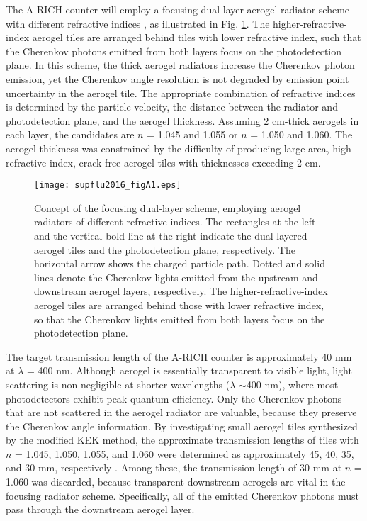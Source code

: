 \documentclass[5p,twocolumn]{elsarticle}
\begin{document}
The A-RICH counter will employ a focusing dual-layer aerogel radiator scheme with different refractive indices \cite{citeS8}, as illustrated in Fig. \ref{fig:figS1}. The higher-refractive-index aerogel tiles are arranged behind tiles with lower refractive index, such that the Cherenkov photons emitted from both layers focus on the photodetection plane. In this scheme, the thick aerogel radiators increase the Cherenkov photon emission, yet the Cherenkov angle resolution is not degraded by emission point uncertainty in the aerogel tile. The appropriate combination of refractive indices is determined by the particle velocity, the distance between the radiator and photodetection plane, and the aerogel thickness. Assuming 2 cm-thick aerogels in each layer, the candidates are $n$ = 1.045 and 1.055 or $n$ = 1.050 and 1.060. The aerogel thickness was constrained by the difficulty of producing large-area, high-refractive-index, crack-free aerogel tiles with thicknesses exceeding 2 cm.

\begin{figure}[t]
\centering 
\texttt{[image: supflu2016\_figA1.eps]}
\caption{Concept of the focusing dual-layer scheme, employing aerogel radiators of different refractive indices. The rectangles at the left and the vertical bold line at the right indicate the dual-layered aerogel tiles and the photodetection plane, respectively. The horizontal arrow shows the charged particle path. Dotted and solid lines denote the Cherenkov lights emitted from the upstream and downstream aerogel layers, respectively. The higher-refractive-index aerogel tiles are arranged behind those with lower refractive index, so that the Cherenkov lights emitted from both layers focus on the photodetection plane.}
\label{fig:figS1}
\end{figure}

The target transmission length of the A-RICH counter is approximately 40 mm at $\lambda $ = 400 nm. Although aerogel is essentially transparent to visible light, light scattering is non-negligible at shorter wavelengths ($\lambda $ $\sim $400 nm), where most photodetectors exhibit peak quantum efficiency. Only the Cherenkov photons that are not scattered in the aerogel radiator are valuable, because they preserve the Cherenkov angle information. By investigating small aerogel tiles synthesized by the modified KEK method, the approximate transmission lengths of tiles with $n$ = 1.045, 1.050, 1.055, and 1.060 were determined as approximately 45, 40, 35, and 30 mm, respectively \cite{cite2,cite10}. Among these, the transmission length of 30 mm at $n$ = 1.060 was discarded, because transparent downstream aerogels are vital in the focusing radiator scheme. Specifically, all of the emitted Cherenkov photons must pass through the downstream aerogel layer.
\end{document}

